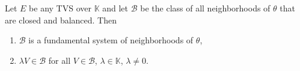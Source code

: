 Let $E$ be any TVS over $\mathbb{K}$ and let $\mathcal{B}$ be the class of all neighborhoods of $\theta$ that are closed and balanced. Then
\begin{enumerate}
\item[(i)] $\mathcal{B}$ is a fundamental system of neighborhoods of $\theta$,
\item[(ii)] $\lambda V \in \mathcal{B}$ for all $V \in \mathcal{B}$, $\lambda \in \mathbb{K}$, $\lambda \neq 0$.
\end{enumerate}
